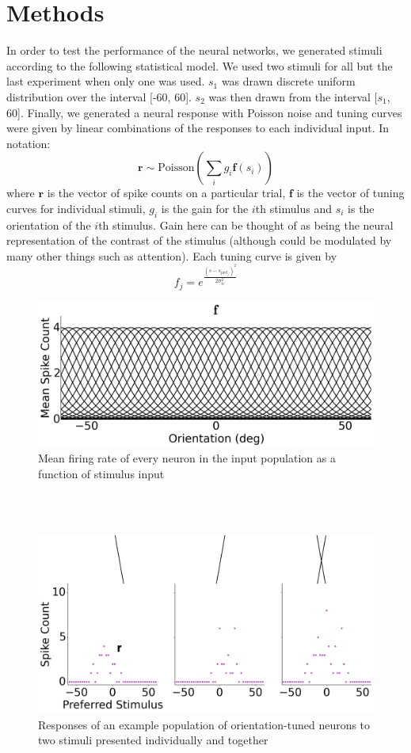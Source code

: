 \documentclass{article} %
\begin{document}
\section{Methods}
In order to test the performance of the neural networks, we generated stimuli according to the following statistical model. We used two stimuli for all but the last experiment when only one was used. $s_1$ was drawn discrete uniform distribution over the interval [-60, 60]. $s_2$ was then drawn from the interval [$s_1$, 60]. Finally, we generated a neural response with Poisson noise and tuning curves were given by linear combinations of the responses to each individual input. In notation:
\begin{equation}
	\mathbf{r} \sim \text{Poisson}(\sum_i g_i \mathbf{f}(s_i))
\end{equation}
where $\mathbf{r}$ is the vector of spike counts on a particular trial, $\mathbf{f}$ is the vector of tuning curves for individual stimuli, $g_i$ is the gain for the $i$th stimulus and $s_i$ is the orientation of the $i$th stimulus. Gain here can be thought of as being the neural representation of the contrast of the stimulus (although could be modulated by many other things such as attention).
Each tuning curve is given by
\begin{equation}
	f_j = e^\frac{(s - s_{\text{pref}_j})^2}{2 \sigma_{\text{tc}}^2}
\end{equation}
\begin{figure}[h]
\centering
\includegraphics[width = \textwidth]{Tuning_Curves.png}
\caption{Mean firing rate of every neuron in the input population as a function of stimulus input}
\end{figure}
\\
\\
\begin{figure}[h]
\centering
\includegraphics[width = \textwidth]{Neural_Response.png}
\caption{Responses of an example population of orientation-tuned neurons to two stimuli presented individually and together}
\label{Neural_Response}
\end{figure}
\end{document}
